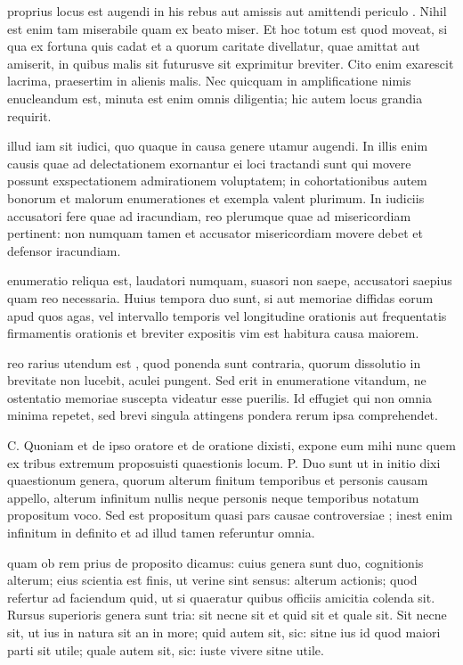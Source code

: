  proprius locus est augendi in his rebus aut amissis aut amittendi periculo . Nihil est enim tam miserabile quam ex beato miser. Et hoc totum est quod moveat, si qua ex fortuna quis cadat et a quorum caritate divellatur, quae amittat aut amiserit, in quibus malis sit futurusve sit exprimitur breviter. Cito enim exarescit lacrima, praesertim in alienis malis. Nec quicquam in amplificatione nimis enucleandum est, minuta est enim omnis diligentia; hic autem locus grandia requirit.

 illud iam sit iudici, quo quaque in causa genere utamur augendi. In illis enim causis quae ad delectationem exornantur ei loci tractandi sunt qui movere possunt exspectationem admirationem voluptatem; in cohortationibus autem bonorum et malorum enumerationes et exempla valent plurimum. In iudiciis accusatori fere quae ad iracundiam, reo plerumque quae ad misericordiam pertinent: non numquam tamen et accusator misericordiam movere debet et defensor iracundiam.

 enumeratio reliqua est, laudatori numquam, suasori non saepe, accusatori saepius quam reo necessaria. Huius tempora duo sunt, si aut memoriae diffidas eorum apud quos agas, vel intervallo temporis vel longitudine orationis aut frequentatis firmamentis orationis et breviter expositis vim est habitura causa maiorem.

 reo rarius utendum est , quod ponenda sunt contraria, quorum dissolutio in brevitate non lucebit, aculei pungent. Sed erit in enumeratione vitandum, ne ostentatio memoriae suscepta videatur esse puerilis. Id effugiet qui non omnia minima repetet, sed brevi singula attingens pondera rerum ipsa comprehendet.

 C. Quoniam et de ipso oratore et de oratione dixisti, expone eum mihi nunc quem ex tribus extremum proposuisti quaestionis locum. P. Duo sunt ut in initio dixi quaestionum genera, quorum alterum finitum temporibus et personis causam appello, alterum infinitum nullis neque personis neque temporibus notatum propositum voco. Sed est propositum quasi pars causae controversiae ; inest enim infinitum in definito et ad illud tamen referuntur omnia.

 quam ob rem prius de proposito dicamus: cuius genera sunt duo, cognitionis alterum; eius scientia est finis, ut verine sint sensus: alterum actionis; quod refertur ad faciendum quid, ut si quaeratur quibus officiis amicitia colenda sit. Rursus superioris genera sunt tria: sit necne sit et quid sit et quale sit. Sit necne sit, ut ius in natura sit an in more; quid autem sit, sic: sitne ius id quod maiori parti sit utile; quale autem sit, sic: iuste vivere sitne utile.

